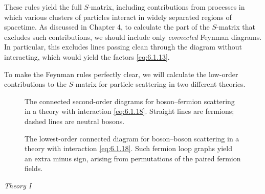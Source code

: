 These rules yield the full $S$-matrix, including contributions from processes
in which various clusters of particles interact in widely separated regions
of spacetime. As discussed in Chapter 4, to calculate the part of the
$S$-matrix that excludes such contributions, we should include only
\emph{connected} Feynman diagrams. In particular, this excludes lines passing
clean through the diagram without interacting, which would yield the factors
\eqref{eq:6.1.13}.

To make the Feynman rules perfectly clear, we will calculate the low-order
contributions to the $S$-matrix for particle scattering in two different
theories.

\begingroup
\renewcommand{\thefigure}{6.\arabic{figure}}
\setcounter{figure}{5}
\begin{figure}[htbp]

\caption{The connected second-order diagrams for boson--fermion scattering in
a theory with interaction \eqref{eq:6.1.18}. Straight lines are fermions;
dashed lines are neutral bosons.}
\label{fig:6.6}
\end{figure}
\endgroup

\begingroup
\renewcommand{\thefigure}{6.\arabic{figure}}
\setcounter{figure}{6}
\begin{figure}[htbp]

\caption{The lowest-order connected diagram for boson--boson scattering in a
theory with interaction \eqref{eq:6.1.18}. Such fermion loop graphs yield an
extra minus sign, arising from permutations of the paired fermion fields.}
\label{fig:6.7}
\end{figure}
\endgroup

\begin{center}
\textit{Theory I}
\end{center}

